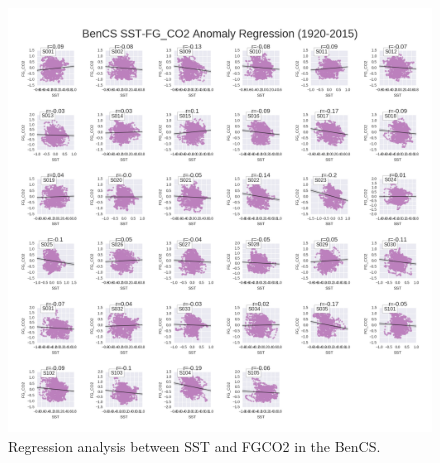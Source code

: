 \documentclass[12pt]{article}
\begin{document}
\clearpage
\begin{figure}[!h]
	\centering
	\includegraphics[width=\linewidth]{../../figs/bencs/regression_plots/smoothed_FGCO2_vs_smoothed_SSTregression_subplots.png}
	\caption{Regression analysis between SST and FGCO2 in the BenCS.}
	\label{fig:BenCS-SST-regressions}
\end{figure}

\clearpage

\end{document}
